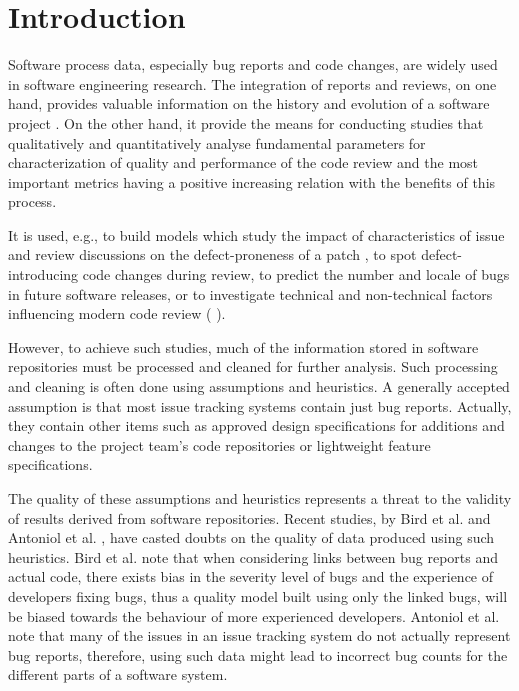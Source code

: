 \documentclass[ifip]{svmult}
\begin{document}
\section{Introduction}
\label{sec:1}
Software process data, especially bug reports and code changes, are widely used in software engineering research. The
integration of reports and reviews, on one hand, provides valuable information on the history and evolution of a software project 
\cite{con0}. 
On the other hand, it provide the means for conducting studies that qualitatively and quantitatively analyse fundamental parameters 
for characterization of quality and performance of the code review and the most important metrics having a positive increasing 
relation with the benefits of this process.

It is used, e.g., to build models which study the impact of characteristics of issue and review discussions on the 
defect-proneness of a patch \cite{con1}, to spot defect-introducing code changes during review, to predict the number and locale 
of bugs in future software releases, or to investigate technical and non-technical 
factors influencing modern code review ( \cite{con2, con3, con4, con5, con6}).

However, to achieve such studies, 
much of the information stored in software repositories
must be processed and cleaned for further analysis. Such 
processing and cleaning is often done using assumptions 
and heuristics. A generally accepted assumption is that most issue
tracking systems contain just bug reports. Actually, 
they contain other items such as approved design specifications for 
additions and changes to the project team’s code repositories or 
lightweight feature specifications.

The quality of these assumptions and heuristics represents a threat to 
the validity of results derived from software 
repositories. Recent studies, by Bird et al. \cite{con7} and Antoniol et al. 
\cite{con8}, have casted doubts on the quality of data produced
using such heuristics. 
Bird et al. \cite{con7} note that when considering links between bug reports and actual 
code, there exists bias in the severity level of bugs and the experience of
developers fixing bugs, thus a quality model built using only the linked 
bugs, will be biased towards the behaviour of more experienced developers.
Antoniol et al. \cite{con8} note that many of the issues in an issue tracking system do 
not actually represent bug reports, therefore, using such data might lead to 
incorrect bug counts for the different parts of a software system.
\end{document}
